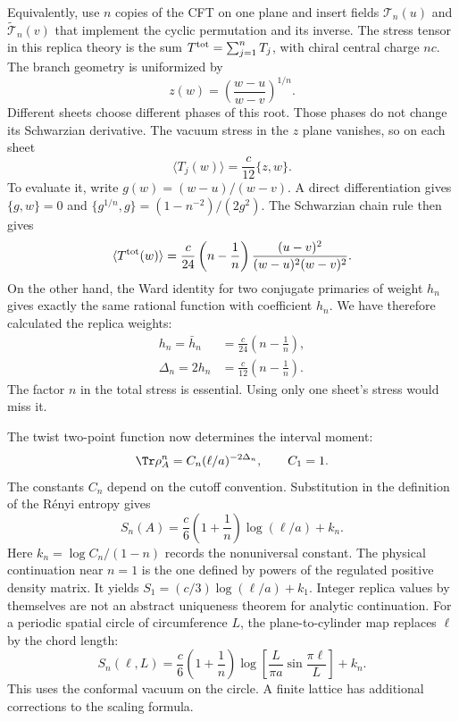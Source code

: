 Equivalently, use $n$ copies of the CFT on one plane and insert fields
$\mathcal T_n(u)$ and $\widetilde{\mathcal T}_n(v)$ that implement
the cyclic permutation and its inverse. The stress tensor in this
replica theory is the sum $T^{\rm tot}=\sum_{j=1}^nT_j$, with chiral
central charge $nc$. The branch geometry is uniformized by
\[
 z(w)=\left(\frac{w-u}{w-v}\right)^{1/n}.
\]
Different sheets choose different phases of this root. Those phases
do not change its Schwarzian derivative. The vacuum stress in the
$z$ plane vanishes, so on each sheet
\[
 \langle T_j(w)\rangle=\frac c{12}\{z,w\}.
\]
To evaluate it, write $g(w)=(w-u)/(w-v)$. A direct differentiation
gives $\{g,w\}=0$ and
$\{g^{1/n},g\}=(1-n^{-2})/(2g^2)$. The Schwarzian chain rule then
gives
\[
 \langle T^{\rm tot}(w)\rangle
 =\frac c{24}\left(n-\frac1n\right)
   \frac{(u-v)^2}{(w-u)^2(w-v)^2}.
\]
On the other hand, the Ward identity for two conjugate primaries of
weight $h_n$ gives exactly the same rational function with coefficient
$h_n$. We have therefore calculated the replica weights:
\begin{equation}\label{eq:MPS-twist-weight}
 \begin{aligned}
 h_n=\bar h_n&=\frac c{24}\left(n-\frac1n\right),\\
 \Delta_n=2h_n&=\frac c{12}\left(n-\frac1n\right).
 \end{aligned}
\end{equation}
The factor $n$ in the total stress is essential. Using only one
sheet's stress would miss it.

The twist two-point function now determines the interval moment:
\[
 \Tr\rho_A^n=C_n(\ell/a)^{-2\Delta_n},\qquad C_1=1.
\]
The constants $C_n$ depend on the cutoff convention. Substitution in
the definition of the R\'enyi entropy gives
\begin{equation}\label{eq:MPS-interval-Renyi}
 S_n(A)=\frac c6\left(1+\frac1n\right)\log(\ell/a)+k_n.
\end{equation}
Here $k_n=\log C_n/(1-n)$ records the nonuniversal constant.
The physical continuation near $n=1$ is the one defined by powers of
the regulated positive density matrix. It yields
$S_1=(c/3)\log(\ell/a)+k_1$. Integer replica values by themselves
are not an abstract uniqueness theorem for analytic continuation.
For a periodic spatial circle of circumference $L$, the plane-to-cylinder
map replaces $\ell$ by the chord length:
\[
 S_n(\ell,L)=\frac c6\left(1+\frac1n\right)
 \log\left[\frac L{\pi a}\sin\frac{\pi\ell}{L}\right]+k_n.
\]
This uses the conformal vacuum on the circle. A finite lattice has
additional corrections to the scaling formula.

